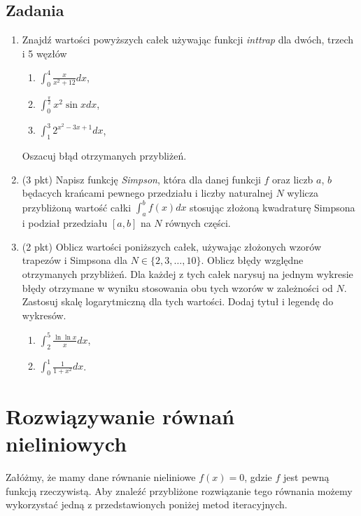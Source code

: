 \documentclass[12pt,a4paper]{article}
\theoremstyle{definition}
\begin{document}
\subsection*{Zadania}
\begin{enumerate}
	
	
	\item Znajdź wartości powyższych całek używając funkcji \emph{inttrap} dla dwóch, trzech i 5 węzłów
	\begin{enumerate}
		\item $\int_{0}^4 \frac{x}{x^2+12}dx$,
		\item $\int_0^{\frac{\pi}{2}}x^2\sin xdx$,
		\item $\int_1^{3}2^{x^2-3x+1}dx$,
	\end{enumerate}
	Oszacuj błąd otrzymanych przybliżeń.
	
	
	
	
	\item (3 pkt) Napisz funkcję \emph{Simpson}, która dla danej funkcji $f$ oraz liczb $a$, $b$ będacych krańcami pewnego przedziału i liczby naturalnej $N$ wylicza przybliżoną wartość całki $\int_a^b f(x)dx$ stosując złożoną kwadraturę Simpsona i podział przedziału $[a,b]$ na $N$ równych części.
	
	\item (2 pkt) Oblicz wartości poniższych całek, używając złożonych wzorów trapezów i Simpsona dla $N\in \{2,3,\ldots,10\}$. Oblicz błędy względne otrzymanych przybliżeń. Dla każdej z tych całek narysuj na jednym wykresie błędy otrzymane w wyniku stosowania obu tych wzorów w zależności od $N$. Zastosuj skalę logarytmiczną dla tych wartości. Dodaj tytuł i legendę do wykresów.
	\begin{enumerate}
		\item $\int_2^5 \frac{\ln\ln x}{x}dx$,
		\item $\int_0^1\frac{1}{1+x^2}dx$.
	\end{enumerate}
\end{enumerate}

\newpage
	\section*{Rozwiązywanie równań nieliniowych}
Załóżmy, że mamy dane równanie nieliniowe $f(x)=0$, gdzie $f$ jest pewną funkcją rzeczywistą. Aby znaleźć przybliżone rozwiązanie tego równania możemy wykorzystać jedną z przedstawionych poniżej metod iteracyjnych.
\end{document}
